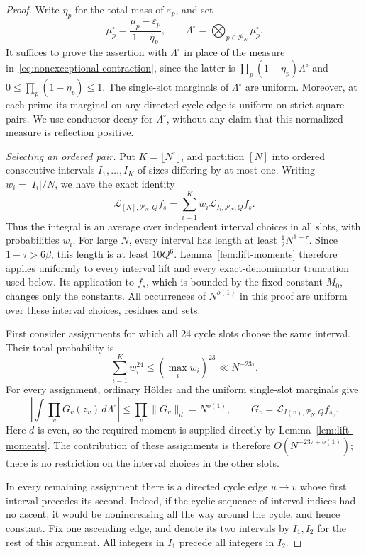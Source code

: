 \begin{proof}
Write \(\eta_p\) for the total mass of \(\varepsilon_p\), and set
\[
 \mu_p^\circ=\frac{\mu_p-\varepsilon_p}{1-\eta_p},
 \qquad \Lambda^\circ=\bigotimes_{p\in\mathcal P_N}\mu_p^\circ.
\]
It suffices to prove the assertion with \(\Lambda^\circ\) in place of the
measure in~\eqref{eq:nonexceptional-contraction}, since the latter is
\(\prod_p(1-\eta_p)\Lambda^\circ\) and \(0\le\prod_p(1-\eta_p)\le1\).
The single-slot marginals of \(\Lambda^\circ\) are uniform. Moreover, at
each prime its marginal on any directed cycle edge is uniform on strict
square pairs. We use conductor decay for \(\Lambda^\circ\), without any
claim that this normalized measure is reflection positive.

\textit{Selecting an ordered pair.}\quad
Put \(K=\lfloor N^\tau\rfloor\), and partition \([N]\) into ordered
consecutive intervals \(I_1,\ldots,I_K\) of sizes differing by at most one.
Writing \(w_i=|I_i|/N\), we have the exact identity
\[
 \mathcal L_{[N],\mathcal P_N,Q}f_s
   =\sum_{i=1}^K w_i\mathcal L_{I_i,\mathcal P_N,Q}f_s.
\]
Thus the integral is an average over independent interval choices in all
slots, with probabilities \(w_i\). For large \(N\), every interval has
length at least \(\tfrac12N^{1-\tau}\). Since \(1-\tau>6\beta\), this
length is at least \(10Q^6\). Lemma~\ref{lem:lift-moments} therefore
applies uniformly to every interval lift and every exact-denominator
truncation used below. Its application to \(f_s\), which is bounded by
the fixed constant \(M_0\), changes only the constants. All occurrences
of \(N^{o(1)}\) in this proof are uniform over these interval choices,
residues and sets.

First consider assignments for which all 24 cycle slots choose the same
interval. Their total probability is
\[
 \sum_{i=1}^K w_i^{24}
 \le(\max_i w_i)^{23}\ll N^{-23\tau}.
\]
For every assignment, ordinary H\"older and the uniform single-slot
marginals give
\[
 \left|\int\prod_v G_v(z_v)\,d\Lambda^\circ\right|
 \le\prod_v\|G_v\|_d=N^{o(1)},
 \qquad
 G_v=\mathcal L_{I(v),\mathcal P_N,Q}f_{s_v}.
\]
Here \(d\) is even, so the required moment is supplied directly by
Lemma~\ref{lem:lift-moments}. The contribution of these assignments is
therefore \(O(N^{-23\tau+o(1)})\); there is no restriction on the interval
choices in the other slots.

In every remaining assignment there is a directed cycle edge \(u\to v\)
whose first interval precedes its second. Indeed, if the cyclic sequence
of interval indices had no ascent, it would be nonincreasing all the way
around the cycle, and hence constant. Fix one ascending edge, and denote
its two intervals by \(I_1,I_2\) for the rest of this argument. All
integers in \(I_1\) precede all integers in \(I_2\).


\end{proof}
